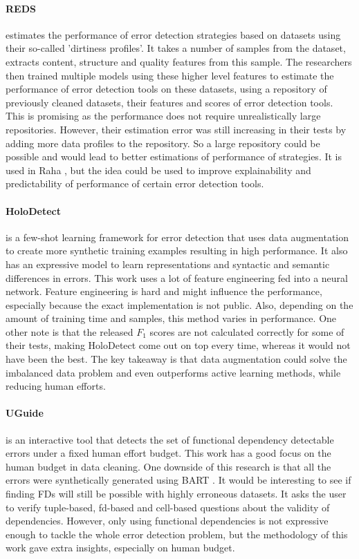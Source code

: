 \paragraph{REDS \cite{Mahdavi2019-pk}} estimates the performance of error detection strategies based on datasets using their so-called 'dirtiness profiles'. It takes a number of samples from the dataset, extracts content, structure and quality features from this sample. 
The researchers then trained multiple models using these higher level features to estimate the performance of error detection tools on these datasets, using a repository of previously cleaned datasets, their features and scores of error detection tools.
This is promising as the performance does not require unrealistically large repositories. However, their estimation error was still increasing in their tests by adding more data profiles to the repository.
So a large repository could be possible and would lead to better estimations of performance of strategies.
It is used in Raha \cite{Mahdavi2019-zf}, but the idea could be used to improve explainability and predictability of performance of certain error detection tools.


\paragraph{HoloDetect \cite{Heidari2019-ox}} is a few-shot learning framework for error detection that uses data augmentation to create more synthetic training examples resulting in high performance. It also has an expressive model to learn representations and syntactic and semantic differences in errors. This work uses a lot of feature engineering fed into a neural network. Feature engineering is hard and might influence the performance, especially because the exact implementation is not public. Also, depending on the amount of training time and samples, this method varies in performance. One other note is that the released $F_1$ scores are not calculated correctly for some of their tests, making HoloDetect come out on top every time, whereas it would not have been the best. The key takeaway is that data augmentation could solve the imbalanced data problem and even outperforms active learning methods, while reducing human efforts. 

\paragraph{UGuide \cite{Thirumuruganathan2017-ip}} is an interactive tool that detects the set of functional dependency detectable errors under a fixed human effort budget. This work has a good focus on the human budget in data cleaning. One downside of this research is that all the errors were synthetically generated using BART \cite{Arocena2015-om}. It would be interesting to see if finding FDs will still be possible with highly erroneous datasets. It asks the user to verify tuple-based, fd-based and cell-based questions about the validity of dependencies. However, only using functional dependencies is not expressive enough to tackle the whole error detection problem, but the methodology of this work gave extra insights, especially on human budget.

